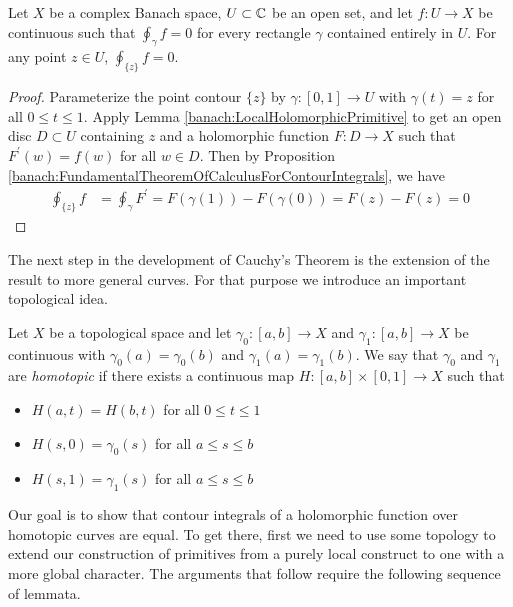 \begin{cor}\label{banach:PointContourIntegralZero}Let $X$ be a complex Banach space, $U \subset \mathbb{C}$ be an open set, and let $f: U \to X$ be continuous such that $\oint_\gamma f = 0$ for every rectangle $\gamma$ contained entirely in $U$.   For any point $z \in U$, $\oint_{\lbrace z \rbrace} f = 0$.
\end{cor}
\begin{proof}
  Parameterize the point contour $\lbrace z \rbrace$ by $\gamma : [0,1] \to U$ with $\gamma(t) = z$ for all $0 \leq t \leq 1$.   Apply Lemma \ref{banach:LocalHolomorphicPrimitive} to get an open disc $D \subset U$ containing $z$ and a holomorphic function $F : D \to X$ such that $F^\prime(w) = f(w)$ for all $w \in D$.   Then by Proposition \ref{banach:FundamentalTheoremOfCalculusForContourIntegrals}, we have
  \begin{align*}
     \oint_{\lbrace z \rbrace} f &= \oint_{\gamma} F^\prime = F(\gamma(1)) - F(\gamma(0)) = F(z) - F(z) = 0 
  \end{align*} 
\end{proof}

The next step in the development of Cauchy's Theorem is the extension of the result to more general curves.   For that purpose we introduce an important topological
idea.
\begin{defn}Let $X$ be a topological space and let $\gamma_0 : [a,b] \to X$ and $\gamma_1: [a,b] \to X$ be continuous with $\gamma_0(a) = \gamma_0(b)$ and $\gamma_1(a) = \gamma_1(b)$.   We say that $\gamma_0$ and $\gamma_1$ are \emph{homotopic} if there exists a continuous map $H : [a,b] \times [0,1] \to X$ such that
  \begin{itemize}
  \item[(i)] $H(a,t) = H(b,t)$ for all $0 \leq t \leq 1$
  \item[(ii)] $H(s,0) = \gamma_0(s)$ for all $a \leq s \leq b$
  \item[(iii)] $H(s,1) = \gamma_1(s)$ for all $a \leq s \leq b$
  \end{itemize}
\end{defn}

Our goal is to show that contour integrals of a holomorphic function over homotopic curves are equal.   To get there, first we need to use some topology to extend our construction of primitives from a purely local construct to one with a more global character.   The arguments that follow require the following sequence of lemmata.

